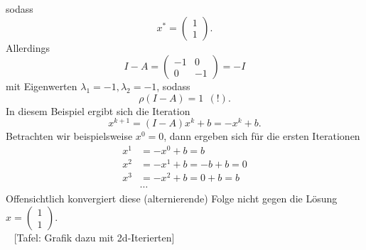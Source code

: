 sodass $$x^* = \begin{pmatrix}1\\1\end{pmatrix}.$$
Allerdings
$$I - A =  \begin{pmatrix}-1&0\\0&-1\end{pmatrix} = -I$$
mit Eigenwerten $\lambda_1 = -1, \lambda_2 = -1$, sodass
$$\rho(I-A) = 1 ~~(!). $$ In diesem Beispiel ergibt sich die Iteration
$$x^{k+1} = (I-A)x^k+b = -x^k+b.$$
Betrachten wir beispielsweise $x^0 = 0$, dann ergeben sich für die ersten Iterationen
\begin{align*}
x^1 &= -x^0 + b = b\\
x^2 &= -x^1 + b = -b +b = 0\\
x^3 &= -x^2 + b = 0 +b = b \\
 &\cdots
\end{align*}
Offensichtlich konvergiert diese (alternierende) Folge nicht gegen die Lösung $x = \begin{pmatrix}1\\1\end{pmatrix}$.\\~ [Tafel: Grafik dazu mit 2d-Iterierten]
%
